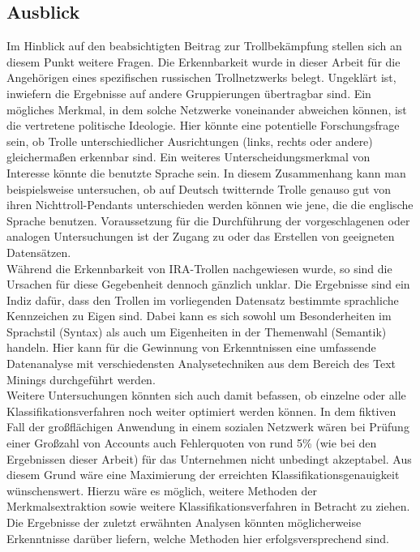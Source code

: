 \subsection{Ausblick}
Im Hinblick auf den beabsichtigten Beitrag zur Trollbekämpfung stellen sich an diesem Punkt weitere Fragen. Die Erkennbarkeit wurde in dieser Arbeit für die Angehörigen eines spezifischen russischen Trollnetzwerks belegt. Ungeklärt ist, inwiefern die Ergebnisse auf andere Gruppierungen übertragbar sind. Ein mögliches Merkmal, in dem solche Netzwerke voneinander abweichen können, ist die vertretene politische Ideologie. Hier könnte eine potentielle Forschungsfrage sein, ob Trolle unterschiedlicher Ausrichtungen (links, rechts oder andere) gleichermaßen erkennbar sind. Ein weiteres Unterscheidungsmerkmal von Interesse könnte die benutzte Sprache sein. In diesem Zusammenhang kann man beispielsweise untersuchen, ob auf Deutsch twitternde Trolle genauso gut von ihren Nichttroll-Pendants unterschieden werden können wie jene, die die englische Sprache benutzen. Voraussetzung für die Durchführung der vorgeschlagenen oder analogen Untersuchungen ist der Zugang zu oder das Erstellen von geeigneten Datensätzen.\\
Während die Erkennbarkeit von IRA-Trollen nachgewiesen wurde, so sind die Ursachen für diese Gegebenheit dennoch gänzlich unklar. Die Ergebnisse sind ein Indiz dafür, dass den Trollen im vorliegenden Datensatz bestimmte sprachliche Kennzeichen zu Eigen sind. Dabei kann es sich sowohl um Besonderheiten im Sprachstil (Syntax) als auch um Eigenheiten in der Themenwahl (Semantik) handeln. Hier kann für die Gewinnung von Erkenntnissen eine umfassende Datenanalyse mit verschiedensten Analysetechniken aus dem Bereich des Text Minings durchgeführt werden.\\
Weitere Untersuchungen könnten sich auch damit befassen, ob einzelne oder alle Klassifikationsverfahren noch weiter optimiert werden können. In dem fiktiven Fall der großflächigen Anwendung in einem sozialen Netzwerk wären bei Prüfung einer Großzahl von Accounts auch Fehlerquoten von rund 5\% (wie bei den Ergebnissen dieser Arbeit) für das Unternehmen nicht unbedingt akzeptabel. Aus diesem Grund wäre eine Maximierung der erreichten Klassifikationsgenauigkeit wünschenswert. Hierzu wäre es möglich, weitere Methoden der Merkmalsextraktion sowie weitere Klassifikationsverfahren in Betracht zu ziehen. Die Ergebnisse der zuletzt erwähnten Analysen könnten möglicherweise Erkenntnisse darüber liefern, welche Methoden hier erfolgsversprechend sind.